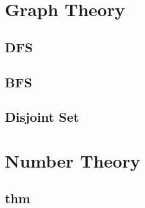 \section{Graph Theory}
    \subsection{DFS}
        
    \subsection{BFS}
        
    \subsection{Disjoint Set}
        

\section{Number Theory}
    \subsection{thm}
        